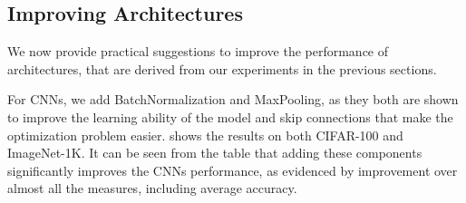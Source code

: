 \begin{table}[h]
\centering
\caption{Role of attention heads: for the Split CIFAR-100 benchmark, increasing the number of attention heads (while fixing the total width), does not impact the performance significantly.}
\label{tab:vit-heads}
\end{table}



\subsection{Improving Architectures} \label{sec:improving_arch}
We now provide practical suggestions to improve the performance of architectures, that are derived from our experiments in the previous sections.

For CNNs, we add BatchNormalization and MaxPooling, as they both are shown to improve the learning ability of the model and skip connections that make the optimization problem easier.  shows the results on both CIFAR-100 and ImageNet-1K. It can be seen from the table that adding these components significantly improves the CNNs performance, as evidenced by improvement over almost all the measures, including average accuracy.

